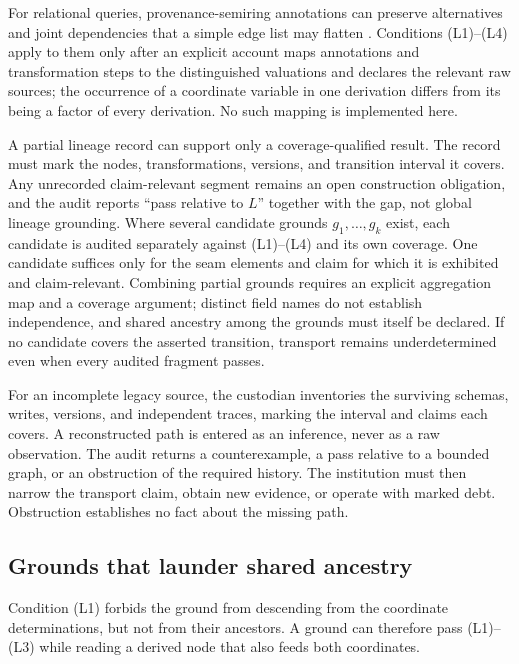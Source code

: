 \documentclass[twocolumn,envcountsect,envcountsame,natbib]{svjour3}
\begin{document}
For relational queries, provenance-semiring annotations can preserve alternatives and joint dependencies that a simple edge list may flatten \citep{greenkarvounarakistannen2007}. Conditions (L1)--(L4) apply to them only after an explicit account maps annotations and transformation steps to the distinguished valuations and declares the relevant raw sources; the occurrence of a coordinate variable in one derivation differs from its being a factor of every derivation. No such mapping is implemented here.

A partial lineage record can support only a coverage-qualified result. The record must mark the nodes, transformations, versions, and transition interval it covers. Any unrecorded claim-relevant segment remains an open construction obligation, and the audit reports ``pass relative to $L$'' together with the gap, not global lineage grounding. Where several candidate grounds $g_1,\ldots,g_k$ exist, each candidate is audited separately against (L1)--(L4) and its own coverage. One candidate suffices only for the seam elements and claim for which it is exhibited and claim-relevant. Combining partial grounds requires an explicit aggregation map and a coverage argument; distinct field names do not establish independence, and shared ancestry among the grounds must itself be declared. If no candidate covers the asserted transition, transport remains underdetermined even when every audited fragment passes.

For an incomplete legacy source, the custodian inventories the surviving schemas, writes, versions, and independent traces, marking the interval and claims each covers. A reconstructed path is entered as an inference, never as a raw observation. The audit returns a counterexample, a pass relative to a bounded graph, or an obstruction of the required history. The institution must then narrow the transport claim, obtain new evidence, or operate with marked debt. Obstruction establishes no fact about the missing path.

\subsection{Grounds that launder shared ancestry}\label{ex:sec:laundering}

Condition (L1) forbids the ground from descending from the coordinate determinations, but not from their ancestors. A ground can therefore pass (L1)--(L3) while reading a derived node that also feeds both coordinates.
\end{document}
